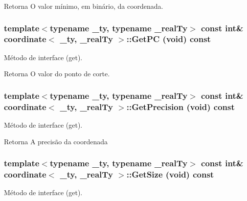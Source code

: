 \begin{DoxyReturn}{Retorna}
O valor mínimo, em binário, da coordenada. 
\end{DoxyReturn}
\hypertarget{classcoordinate_a08bd46e2f1731b7042718f9c395b768d}{
\subsubsection[{GetPC}]{\setlength{\rightskip}{0pt plus 5cm}template$<$typename \_\-ty, typename \_\-realTy$>$ const int\& {\bf coordinate}$<$ \_\-ty, \_\-realTy $>$::GetPC (void) const}}
\label{classcoordinate_a08bd46e2f1731b7042718f9c395b768d}
Método de interface (get).

\begin{DoxyReturn}{Retorna}
O valor do ponto de corte. 
\end{DoxyReturn}
\hypertarget{classcoordinate_a92cf59fbfd315c208a5533b68ce3a3d0}{
\subsubsection[{GetPrecision}]{\setlength{\rightskip}{0pt plus 5cm}template$<$typename \_\-ty, typename \_\-realTy$>$ const int\& {\bf coordinate}$<$ \_\-ty, \_\-realTy $>$::GetPrecision (void) const}}
\label{classcoordinate_a92cf59fbfd315c208a5533b68ce3a3d0}
Método de interface (get).

\begin{DoxyReturn}{Retorna}
A precisão da coordenada 
\end{DoxyReturn}
\hypertarget{classcoordinate_a0e3450e6a6a1b4d577886fb68883d61c}{
\subsubsection[{GetSize}]{\setlength{\rightskip}{0pt plus 5cm}template$<$typename \_\-ty, typename \_\-realTy$>$ const int\& {\bf coordinate}$<$ \_\-ty, \_\-realTy $>$::GetSize (void) const}}
\label{classcoordinate_a0e3450e6a6a1b4d577886fb68883d61c}
Método de interface (get).

